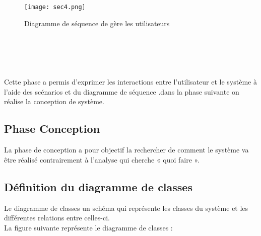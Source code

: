 \begin{figure}
\centering
  \texttt{[image: sec4.png]}\\
  \caption{Diagramme de séquence de gère les utilisateurs }
\end{figure}
\paragraph{\\}
\paragraph{\\}


Cette phase a permis d'exprimer les interactions entre l'utilisateur  et le système à l'aide des scénarios et du diagramme de séquence .dans la phase suivante on réalise la conception de système.


\subsection{Phase Conception }
La phase de conception a pour objectif la rechercher de comment le système va être réalisé contrairement à l'analyse qui cherche « quoi faire ».
\subsection{Définition du diagramme de classes}

 Le diagramme de classes un schéma qui représente les classes du système et les différentes relations entre celles-ci.
\\
La figure suivante représente le diagramme de classes : 
